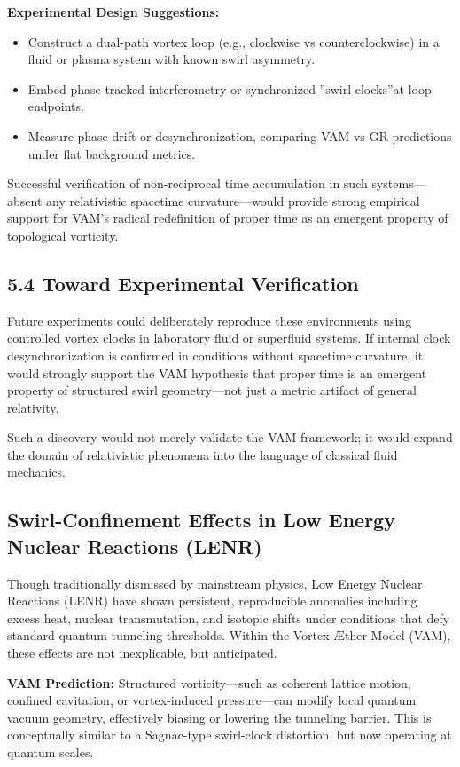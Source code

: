 \documentclass[a4paper, aps,preprint,superscriptaddress, 12pt]{revtex4}
\providecommand{\grqq}{\textquotedblright}
\begin{document}
\textbf{Experimental Design Suggestions:}
\begin{itemize}
    \item Construct a dual-path vortex loop (e.g., clockwise vs counterclockwise) in a fluid or plasma system with known swirl asymmetry.
    \item Embed phase-tracked interferometry or synchronized \grqq swirl clocks\textquotedblright at loop endpoints.
    \item Measure phase drift or desynchronization, comparing VAM vs GR predictions under flat background metrics.
\end{itemize}

Successful verification of non-reciprocal time accumulation in such systems---absent any relativistic spacetime curvature---would provide strong empirical support for VAM's radical redefinition of proper time as an emergent property of topological vorticity.


\subsection*{5.4 Toward Experimental Verification}

Future experiments could deliberately reproduce these environments using controlled vortex clocks in laboratory fluid or superfluid systems. If internal clock desynchronization is confirmed in conditions without spacetime curvature, it would strongly support the VAM hypothesis that proper time is an emergent property of structured swirl geometry---not just a metric artifact of general relativity.


Such a discovery would not merely validate the VAM framework; it would expand the domain of relativistic phenomena into the language of classical fluid mechanics.

\subsection{Swirl-Confinement Effects in Low Energy Nuclear Reactions (LENR)}

Though traditionally dismissed by mainstream physics, Low Energy Nuclear Reactions (LENR) have shown persistent, reproducible anomalies including excess heat, nuclear transmutation, and isotopic shifts under conditions that defy standard quantum tunneling thresholds. Within the Vortex Æther Model (VAM), these effects are not inexplicable, but anticipated.

\textbf{VAM Prediction:} Structured vorticity---such as coherent lattice motion, confined cavitation, or vortex-induced pressure---can modify local quantum vacuum geometry, effectively biasing or lowering the tunneling barrier. This is conceptually similar to a Sagnac-type swirl-clock distortion, but now operating at quantum scales.
\end{document}

